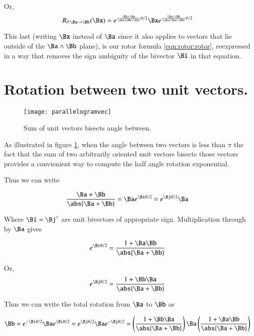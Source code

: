 Or,
\[
R_{\theta : \Ba \rightarrow \Bb}(\Bx)
= e^{ \frac{\Bb \wedge \Ba}{\abs{\Bb \wedge \Ba}} \theta/2 } \Bx e^{ \frac{\Ba \wedge \Bb}{\abs{\Ba \wedge \Bb}} \theta/2 }
\]

This last (writing $\Bx$ instead of $\Ba$ since it also applies to vectors that lie outside of the $\Ba \wedge \Bb$ plane), 
is our rotor formula \ref{eqn:rotor:rotor}, reexpressed in a way that removes the sign ambiguity of the bivector $\Bi$ in that equation.

\section{Rotation between two unit vectors. }

\begin{figure}[htp]
\centering
\texttt{[image: parallelogramvec]}
\caption{Sum of unit vectors bisects angle between.}\label{fig:parallelogramvec}
\end{figure}

As illustrated in figure \ref{fig:parallelogramvec}, when the angle between two vectors is less than $\pi$
the fact that the sum of two arbitrarily oriented unit vectors bisects those vectors provides a convienient 
way to compute the half angle rotation exponential.

Thus we can write

\begin{equation*}
\frac{\Ba + \Bb}{\abs{\Ba + \Bb}} = \Ba e^{\Bi\theta/2} = e^{\Bj\theta/2} \Ba
\end{equation*}

Where $\Bi = \Bj^\dagger$ are unit bivectors of appropriate sign.  Multiplication through by $\Ba$ gives

\begin{equation*}
e^{\Bi\theta/2} = 
\frac{1 + \Ba\Bb}{\abs{\Ba + \Bb}}
\end{equation*}

Or,
\begin{equation*}
e^{\Bj\theta/2} =
\frac{1 + \Bb\Ba}{\abs{\Ba + \Bb}}
\end{equation*}

Thus we can write the total rotation from $\Ba$ to $\Bb$ as

\begin{equation*}
\Bb 
= e^{-\Bi\theta/2} \Ba e^{\Bi\theta/2}
= e^{\Bj\theta/2} \Ba e^{-\Bj\theta/2}
= \left(\frac{1 + \Bb\Ba}{\abs{\Ba + \Bb}}\right) \Ba \left(\frac{1 + \Ba\Bb}{\abs{\Ba + \Bb}}\right)
\end{equation*}

